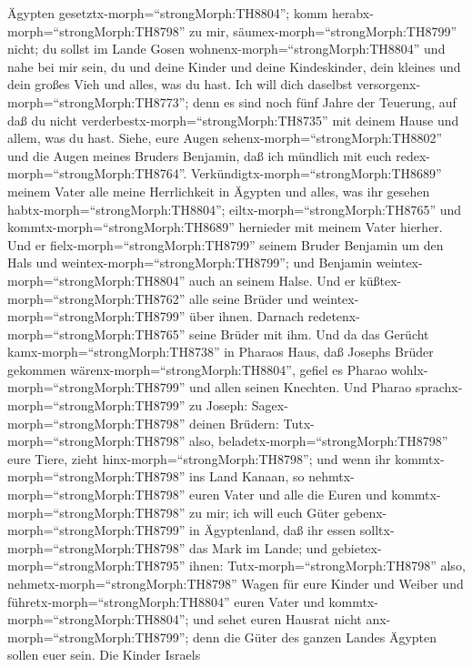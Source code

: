 Ägypten gesetztx-morph=``strongMorph:TH8804''; komm
herabx-morph=``strongMorph:TH8798'' zu mir,
säumex-morph=``strongMorph:TH8799'' nicht;  du sollst im
Lande Gosen wohnenx-morph=``strongMorph:TH8804'' und nahe bei mir sein,
du und deine Kinder und deine Kindeskinder, dein kleines und dein großes
Vieh und alles, was du hast.  Ich will dich daselbst
versorgenx-morph=``strongMorph:TH8773''; denn es sind noch fünf Jahre
der Teuerung, auf daß du nicht verderbestx-morph=``strongMorph:TH8735''
mit deinem Hause und allem, was du hast.  Siehe, eure Augen
sehenx-morph=``strongMorph:TH8802'' und die Augen meines Bruders
Benjamin, daß ich mündlich mit euch redex-morph=``strongMorph:TH8764''.
 Verkündigtx-morph=``strongMorph:TH8689'' meinem Vater alle
meine Herrlichkeit in Ägypten und alles, was ihr gesehen
habtx-morph=``strongMorph:TH8804''; eiltx-morph=``strongMorph:TH8765''
und kommtx-morph=``strongMorph:TH8689'' hernieder mit meinem Vater
hierher.  Und er fielx-morph=``strongMorph:TH8799'' seinem
Bruder Benjamin um den Hals und weintex-morph=``strongMorph:TH8799'';
und Benjamin weintex-morph=``strongMorph:TH8804'' auch an seinem Halse.
 Und er küßtex-morph=``strongMorph:TH8762'' alle seine
Brüder und weintex-morph=``strongMorph:TH8799'' über ihnen. Darnach
redetenx-morph=``strongMorph:TH8765'' seine Brüder mit ihm.
 Und da das Gerücht kamx-morph=``strongMorph:TH8738'' in
Pharaos Haus, daß Josephs Brüder gekommen
wärenx-morph=``strongMorph:TH8804'', gefiel es Pharao
wohlx-morph=``strongMorph:TH8799'' und allen seinen Knechten.
 Und Pharao sprachx-morph=``strongMorph:TH8799'' zu Joseph:
Sagex-morph=``strongMorph:TH8798'' deinen Brüdern:
Tutx-morph=``strongMorph:TH8798'' also,
beladetx-morph=``strongMorph:TH8798'' eure Tiere, zieht
hinx-morph=``strongMorph:TH8798'';  und wenn ihr
kommtx-morph=``strongMorph:TH8798'' ins Land Kanaan, so
nehmtx-morph=``strongMorph:TH8798'' euren Vater und alle die Euren und
kommtx-morph=``strongMorph:TH8798'' zu mir; ich will euch Güter
gebenx-morph=``strongMorph:TH8799'' in Ägyptenland, daß ihr essen
solltx-morph=``strongMorph:TH8798'' das Mark im Lande;  und
gebietex-morph=``strongMorph:TH8795'' ihnen:
Tutx-morph=``strongMorph:TH8798'' also,
nehmetx-morph=``strongMorph:TH8798'' Wagen für eure Kinder und Weiber
und führetx-morph=``strongMorph:TH8804'' euren Vater und
kommtx-morph=``strongMorph:TH8804'';  und sehet euren
Hausrat nicht anx-morph=``strongMorph:TH8799''; denn die Güter des
ganzen Landes Ägypten sollen euer sein.  Die Kinder Israels
